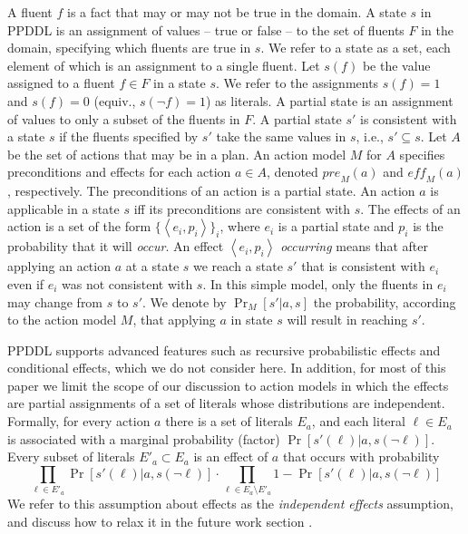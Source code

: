 \documentclass[letterpaper]{article} %
\newcommand{\eff}{\textit{eff}}
\newcommand{\pre}{\textit{pre}}
\newcommand{\tuple}[1]{\ensuremath{\left \langle #1 \right \rangle }}
\begin{document}
A fluent $f$ is a fact that may or may not be true in the domain. 
A state $s$ in PPDDL is an assignment of values -- true or false -- to the set of fluents $F$ in the domain, specifying which fluents are true in $s$. 
We refer to a state as a set, each element of which is an assignment to a single fluent.
Let $s(f)$ be the value assigned to a fluent $f\in F$ in a state $s$. We refer to the assignments $s(f)=1$ and $s(f)=0$ (equiv., $s(\neg f)=1$) as literals.
A partial state is an assignment of values to only a subset of the fluents in $F$. 
A partial state $s'$ is consistent with a state $s$ 
if the fluents specified by $s'$ take the same values in $s$, i.e., $s'\subseteq s$. 
Let $A$ be the set of actions that may be in a plan. 
An action model $M$ for $A$ specifies preconditions and effects for each action $a\in A$, 
denoted $\pre_M(a)$ and $\eff_M(a)$, respectively. 
The preconditions of an action is a partial state. 
An action $a$ is applicable in a state $s$ iff its preconditions are consistent with $s$. 
The effects of an action is a set of the form $\{ \tuple{e_i, p_i} \}_i$, 
where $e_i$ is a partial state and $p_i$ is the probability that it will \emph{occur}. 
An effect $\tuple{e_i, p_i}$ \emph{occurring} means that after applying an action $a$ at a state $s$ we reach a state $s'$ that is consistent with $e_i$ even if $e_i$ was not consistent with $s$. In this simple model, only the fluents in $e_i$ may change from $s$ to $s'$. We denote by $\Pr_M[s'|a,s]$ the probability, according to the action model $M$, 
that applying $a$ in state $s$ will result in reaching $s'$. 

PPDDL supports advanced features such as recursive probabilistic effects and conditional effects, which we do not consider here. In addition, for most of this paper we limit the scope of our discussion to action models in which the effects are partial assignments of a set of literals whose distributions are independent. 
Formally, for every action $a$ there is a set of literals $E_a$, 
and each literal $\ell\in E_a$ is associated with a marginal probability (factor) $\Pr[s'(\ell)|a,s(\neg \ell)]$. Every subset of literals $E'_a\subset E_a$ is an effect of $a$ that occurs with probability 
\begin{equation}
    \prod_{\ell\in E'_a} \Pr[s'(\ell)|a,s(\neg \ell)]\cdot
    \prod_{\ell\in E_a\setminus E'_a} 1-\Pr[s'(\ell)|a,s(\neg \ell)]   
    \label{eq:assumption}
\end{equation}
We refer to this assumption about effects as the \emph{independent effects} assumption, and discuss how to relax it in the future work section . 
\end{document}
